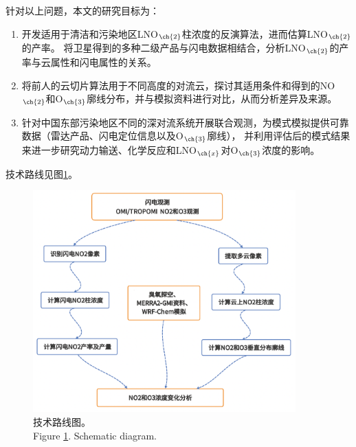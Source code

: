 针对以上问题，本文的研究目标为：

\begin{enumerate}[label=（\arabic*）, labelindent=\parindent, nosep, leftmargin=0pt, widest=0, itemindent=*, topsep=0pt, partopsep=0pt, parsep=0pt]

\item 开发适用于清洁和污染地区LNO$_{\ch{2}}$柱浓度的反演算法，进而估算LNO$_{\ch{2}}$的产率。
将卫星得到的多种二级产品与闪电数据相结合，分析LNO$_{\ch{2}}$的产率与云属性和闪电属性的关系。

\item 将前人的云切片算法用于不同高度的对流云，探讨其适用条件和得到的NO$_{\ch{2}}$和O$_{\ch{3}}$廓线分布，并与模拟资料进行对比，从而分析差异及来源。

\item 针对中国东部污染地区不同的深对流系统开展联合观测，为模式模拟提供可靠数据（雷达产品、闪电定位信息以及O$_{\ch{3}}$廓线），
并利用评估后的模式结果来进一步研究动力输送、化学反应和LNO$_{\ch{x}}$对O$_{\ch{3}}$浓度的影响。

\end{enumerate}


技术路线见图\ref{figure:schematic_diagram}。

\begin{figure}[H]
\centering
\includegraphics[width=0.9\textwidth]{./figures/schematic_diagram.png}
\caption{技术路线图。\\
Figure \ref{figure:schematic_diagram}. Schematic diagram.
}
\label{figure:schematic_diagram}
\end{figure}

